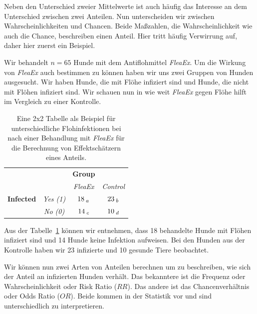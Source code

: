 \documentclass[
  letterpaper,
]{scrbook}
\begin{document}
Neben den Unterschied zweier Mittelwerte ist auch häufig das Interesse
an dem Unterschied zwischen zwei Anteilen. Nun unterscheiden wir
zwischen Wahrscheinlichkeiten und Chancen. Beide Maßzahlen, die
Wahrscheinlichkeit wie auch die Chance, beschreiben einen Anteil. Hier
tritt häufig Verwirrung auf, daher hier zuerst ein Beispiel.

Wir behandelt \(n = 65\) Hunde mit dem Antiflohmittel \emph{FleaEx}. Um
die Wirkung von \emph{FleaEx} auch bestimmen zu können haben wir uns
zwei Gruppen von Hunden ausgesucht. Wir haben Hunde, die mit Flöhe
infiziert sind und Hunde, die nicht mit Flöhen infiziert sind. Wir
schauen nun in wie weit \emph{FleaEx} gegen Flöhe hilft im Vergleich zu
einer Kontrolle.

\hypertarget{tbl-2x2-ratio-delta}{}
\begin{longtable}[]{@{}cccc@{}}
\caption{\label{tbl-2x2-ratio-delta}Eine 2x2 Tabelle als Beispiel für
unterschiedliche Flohinfektionen bei nach einer Behandlung mit
\emph{FleaEx} für die Berechnung von Effektschätzern eines
Anteils.}\tabularnewline
\toprule()
\endhead
& & \textbf{Group} & \\
& & \emph{FleaEx} & \emph{Control} \\
\textbf{Infected} & \emph{Yes (1)} & \(18_{\;\Large a}\) &
\(23_{\;\Large b}\) \\
& \emph{No (0)} & \(14_{\;\Large c}\) & \(10_{\;\Large d}\) \\
\bottomrule()
\end{longtable}

Aus der Tabelle~\ref{tbl-2x2-ratio-delta} können wir entnehmen, dass 18
behandelte Hunde mit Flöhen infiziert sind und 14 Hunde keine Infektion
aufweisen. Bei den Hunden aus der Kontrolle haben wir 23 infizierte und
10 gesunde Tiere beobachtet.

{}

Wir können nun zwei Arten von Anteilen berechnen um zu beschreiben, wie
sich der Anteil an infizierten Hunden verhält. Das bekanntere ist die
Frequenz oder Wahrscheinlichkeit oder Risk Ratio (\(RR\)). Das andere
ist das Chancenverhältnis oder Odds Ratio (\(OR\)). Beide kommen in der
Statistik vor und sind unterschiedlich zu interpretieren.
\end{document}
